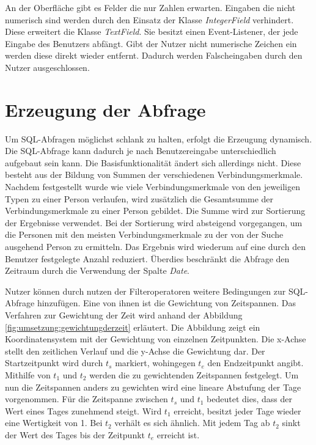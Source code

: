 An der Oberfläche gibt es Felder die nur Zahlen erwarten. Eingaben die nicht numerisch sind werden durch den Einsatz der Klasse \textit{IntegerField} verhindert. Diese erweitert die Klasse \textit{TextField}. Sie besitzt einen Event-Listener, der jede Eingabe des Benutzers abfängt. Gibt der Nutzer nicht numerische Zeichen ein werden diese direkt wieder entfernt. Dadurch werden Falscheingaben durch den Nutzer ausgeschlossen.

\section{Erzeugung der Abfrage}

Um SQL-Abfragen möglichst schlank zu halten, erfolgt die Erzeugung dynamisch. Die SQL-Abfrage kann dadurch je nach Benutzereingabe unterschiedlich aufgebaut sein kann. Die Basisfunktionalität ändert sich allerdings nicht. Diese besteht aus der Bildung von Summen der verschiedenen Verbindungsmerkmale. Nachdem festgestellt wurde wie viele Verbindungsmerkmale von den jeweiligen Typen zu einer Person verlaufen, wird zusätzlich die Gesamtsumme der Verbindungsmerkmale zu einer Person gebildet. Die Summe wird zur Sortierung der Ergebnisse verwendet. Bei der Sortierung wird absteigend vorgegangen, um die Personen mit den meisten Verbindungsmerkmale zu der von der Suche ausgehend Person zu ermitteln. Das Ergebnis wird wiederum auf eine durch den Benutzer festgelegte Anzahl reduziert. Überdies beschränkt die Abfrage den Zeitraum durch die Verwendung der Spalte \textit{Date}.

Nutzer können durch nutzen der Filteroperatoren weitere Bedingungen zur SQL-Abfrage hinzufügen. Eine von ihnen ist die Gewichtung von Zeitspannen. Das Verfahren zur Gewichtung der Zeit wird anhand der Abbildung \ref{fig:umsetzung:gewichtungderzeit} erläutert. Die Abbildung zeigt ein Koordinatensystem mit der Gewichtung von einzelnen Zeitpunkten. Die x-Achse stellt den zeitlichen Verlauf und die y-Achse die Gewichtung dar. Der Startzeitpunkt wird durch $t_{s}$ markiert, wohingegen $t_{e}$ den Endzeitpunkt angibt. Mithilfe von $t_1$ und $t_2$ werden die zu gewichtenden Zeitspannen festgelegt. Um nun die Zeitspannen anders zu gewichten wird eine lineare Abstufung der Tage vorgenommen. Für die Zeitspanne zwischen $t_{s}$ und $t_1$ bedeutet dies, dass der Wert eines Tages zunehmend steigt. Wird $t_1$ erreicht, besitzt jeder Tage wieder eine Wertigkeit von 1. Bei $t_2$ verhält es sich ähnlich. Mit jedem Tag ab $t_2$ sinkt der Wert des Tages bis der Zeitpunkt $t_{e}$ erreicht ist.

